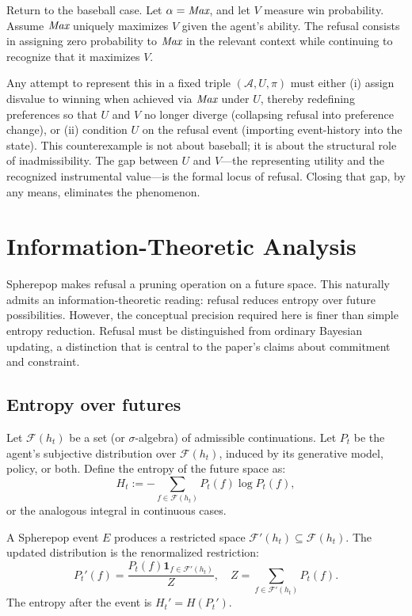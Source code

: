 \documentclass[11pt]{article}
\newcommand{\Future}{\mathcal{F}}
\newcommand{\Act}{\mathcal{A}}
\begin{document}
Return to the baseball case. Let $\alpha = \emph{Max}$, and let $V$ measure
win probability. Assume $\emph{Max}$ uniquely maximizes $V$ given the agent's
ability. The refusal consists in assigning zero probability to $\emph{Max}$ in
the relevant context while continuing to recognize that it maximizes $V$.

Any attempt to represent this in a fixed triple $(\Act, U, \pi)$ must either
(i) assign disvalue to winning when achieved via $\emph{Max}$ under $U$, thereby
redefining preferences so that $U$ and $V$ no longer diverge (collapsing refusal
into preference change), or (ii) condition $U$ on the refusal event (importing
event-history into the state). This counterexample is not about baseball; it is
about the structural role of inadmissibility. The gap between $U$ and $V$---the
representing utility and the recognized instrumental value---is the formal locus
of refusal. Closing that gap, by any means, eliminates the phenomenon.

\section{Information-Theoretic Analysis}
\label{sec:info}

Spherepop makes refusal a pruning operation on a future space. This naturally
admits an information-theoretic reading: refusal reduces entropy over future
possibilities. However, the conceptual precision required here is finer than
simple entropy reduction. Refusal must be distinguished from ordinary Bayesian
updating, a distinction that is central to the paper's claims about commitment
and constraint.

\subsection{Entropy over futures}

Let $\Future(h_t)$ be a set (or $\sigma$-algebra) of admissible continuations.
Let $P_t$ be the agent's subjective distribution over $\Future(h_t)$, induced
by its generative model, policy, or both. Define the entropy of the future
space as:
\[
H_t := - \sum_{f\in \Future(h_t)} P_t(f)\log P_t(f),
\]
or the analogous integral in continuous cases.

A Spherepop event $E$ produces a restricted space
$\Future'(h_t) \subseteq \Future(h_t)$. The updated distribution is the
renormalized restriction:
\[
P_t'(f) = \frac{P_t(f)\mathbf{1}_{f\in \Future'(h_t)}}{Z},
\quad
Z = \sum_{f\in \Future'(h_t)} P_t(f).
\]
The entropy after the event is $H_t' = H(P_t')$.
\end{document}
